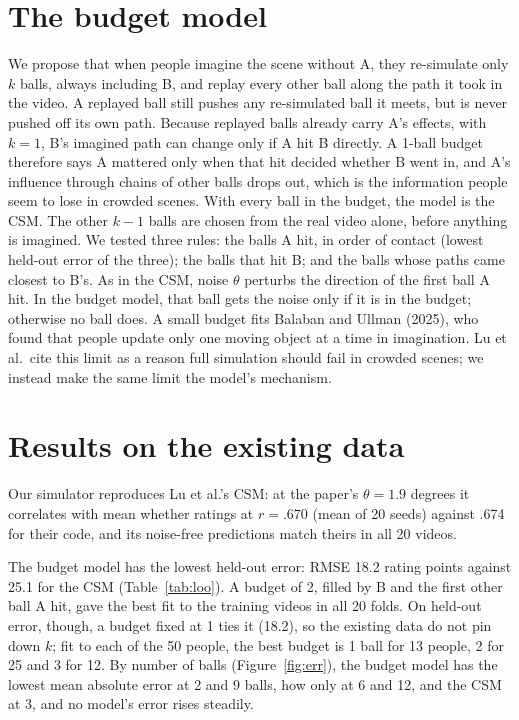 \documentclass[10pt]{article}
\begin{document}
\section*{The budget model}
We propose that when people imagine the scene without A, they re-simulate only $k$ balls, always including B, and replay every other ball along the path it took in the video. A replayed ball still pushes any re-simulated ball it meets, but is never pushed off its own path. Because replayed balls already carry A's effects, with $k=1$, B's imagined path can change only if A hit B directly. A 1-ball budget therefore says A mattered only when that hit decided whether B went in, and A's influence through chains of other balls drops out, which is the information people seem to lose in crowded scenes. With every ball in the budget, the model is the CSM. The other $k-1$ balls are chosen from the real video alone, before anything is imagined. We tested three rules: the balls A hit, in order of contact (lowest held-out error of the three); the balls that hit B; and the balls whose paths came closest to B's. As in the CSM, noise $\theta$ perturbs the direction of the first ball A hit. In the budget model, that ball gets the noise only if it is in the budget; otherwise no ball does. A small budget fits Balaban and Ullman (2025), who found that people update only one moving object at a time in imagination. Lu et al.\ cite this limit as a reason full simulation should fail in crowded scenes; we instead make the same limit the model's mechanism.

\section*{Results on the existing data}
Our simulator reproduces Lu et al.'s CSM: at the paper's $\theta=1.9$ degrees it correlates with mean whether ratings at $r=.670$ (mean of 20 seeds) against .674 for their code, and its noise-free predictions match theirs in all 20 videos.

The budget model has the lowest held-out error: RMSE 18.2 rating points against 25.1 for the CSM (Table~\ref{tab:loo}). A budget of 2, filled by B and the first other ball A hit, gave the best fit to the training videos in all 20 folds. On held-out error, though, a budget fixed at 1 ties it (18.2), so the existing data do not pin down $k$; fit to each of the 50 people, the best budget is 1 ball for 13 people, 2 for 25 and 3 for 12. By number of balls (Figure~\ref{fig:err}), the budget model has the lowest mean absolute error at 2 and 9 balls, how only at 6 and 12, and the CSM at 3, and no model's error rises steadily.
\end{document}

